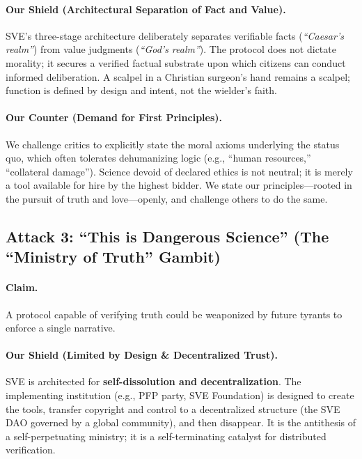 \documentclass[11pt,a4paper]{article}
\begin{document}
\paragraph{\textbf{Our Shield (Architectural Separation of Fact and Value).}} SVE's three-stage architecture deliberately separates verifiable facts (\textit{``Caesar's realm''}) from value judgments (\textit{``God's realm''}). The protocol does not dictate morality; it secures a verified factual substrate upon which citizens can conduct informed deliberation. A scalpel in a Christian surgeon's hand remains a scalpel; function is defined by design and intent, not the wielder's faith.

\paragraph{\textbf{Our Counter (Demand for First Principles).}} We challenge critics to explicitly state the moral axioms underlying the status quo, which often tolerates dehumanizing logic (e.g., ``human resources,'' ``collateral damage''). Science devoid of declared ethics is not neutral; it is merely a tool available for hire by the highest bidder. We state our principles—rooted in the pursuit of truth and love—openly, and challenge others to do the same.

\vspace{1em}

\subsection*{\textcolor{accentcolor}{Attack 3: ``This is Dangerous Science'' (The ``Ministry of Truth'' Gambit)}}

\paragraph{\textbf{Claim.}} A protocol capable of verifying truth could be weaponized by future tyrants to enforce a single narrative.

\paragraph{\textbf{Our Shield (Limited by Design \& Decentralized Trust).}} SVE is architected for \textbf{self-dissolution and decentralization}. The implementing institution (e.g., PFP party, SVE Foundation) is designed to create the tools, transfer copyright and control to a decentralized structure (the SVE DAO governed by a global community), and then disappear. It is the antithesis of a self-perpetuating ministry; it is a self-terminating catalyst for distributed verification.
\end{document}
